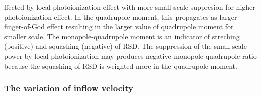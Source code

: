 \documentclass[useAMS,usenatbib,twocolumn]{mn2e}
\begin{document}
ffected by local photoionization
effect with more small scale suppresion for higher photoionization effect.
In the quadrupole moment, this propagates as larger finger-of-God effect resulting
in the larger value of quadrupole moment for smaller scale. The monopole-quadrupole
moment is an indicator of streching (positive) and squashing (negative) of RSD.
The suppression of the small-scale power by local photoionization may
produces negative monopole-quadrupole ratio because the squashing of RSD is
weighted more in the quadrupole moment.


\subsubsection{The variation of inflow velocity}

\begin{figure}
 \begin{center}

\end{center}
\end{figure}
\end{document}
